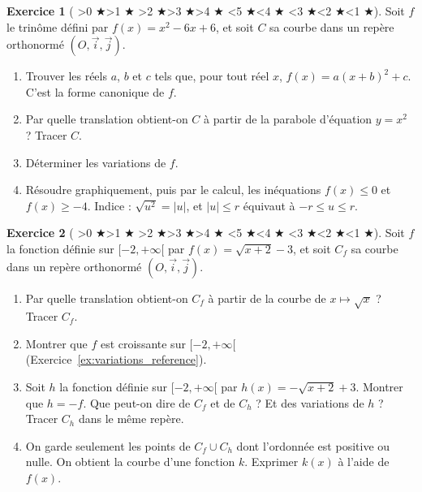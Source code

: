 \documentclass[12pt,a4paper]{article}
\newcommand{\diff}[1]{%
  \textcolor{orange!80!black}{\ifnum#1>0 $\bigstar$\fi\ifnum#1>1 $\bigstar$\fi
  \ifnum#1>2 $\bigstar$\fi\ifnum#1>3 $\bigstar$\fi\ifnum#1>4 $\bigstar$\fi}%
  \textcolor{gray!40}{\ifnum#1<5 $\bigstar$\fi\ifnum#1<4 $\bigstar$\fi
  \ifnum#1<3 $\bigstar$\fi\ifnum#1<2 $\bigstar$\fi\ifnum#1<1 $\bigstar$\fi}}
\theoremstyle{plain}
\theoremstyle{definition}
\newtheorem{exercise}{Exercice}
\theoremstyle{remark}
\begin{document}
\begin{exercise}[\diff{3}]
Soit $f$ le trinôme défini par $f(x) = x^2 - 6x + 6$, et soit $C$ sa courbe dans un
repère orthonormé $(O, \vec{i}, \vec{j})$.
\begin{enumerate}[label=\alph*)]
  \item Trouver les réels $a$, $b$ et $c$ tels que, pour tout réel $x$,
  $f(x) = a(x + b)^2 + c$. C'est la forme canonique de $f$.
  \item Par quelle translation obtient-on $C$ à partir de la parabole d'équation
  $y = x^2$ ? Tracer $C$.
  \item Déterminer les variations de $f$.
  \item Résoudre graphiquement, puis par le calcul, les inéquations $f(x) \le 0$ et
  $f(x) \ge -4$. Indice : $\sqrt{u^2} = \lvert u \rvert$, et $\lvert u \rvert \le r$
  équivaut à $-r \le u \le r$.
\end{enumerate}
\label{ex:canonical_form}
\end{exercise}

\begin{exercise}[\diff{4}]
Soit $f$ la fonction définie sur $[-2, +\infty[$ par $f(x) = \sqrt{x + 2} - 3$, et
soit $C_f$ sa courbe dans un repère orthonormé $(O, \vec{i}, \vec{j})$.
\begin{enumerate}[label=\alph*)]
  \item Par quelle translation obtient-on $C_f$ à partir de la courbe de
  $x \mapsto \sqrt{x}$ ? Tracer $C_f$.
  \item Montrer que $f$ est croissante sur $[-2, +\infty[$ (Exercice~\ref{ex:variations_reference}).
  \item Soit $h$ la fonction définie sur $[-2, +\infty[$ par
  $h(x) = -\sqrt{x + 2} + 3$. Montrer que $h = -f$. Que peut-on dire de $C_f$ et de
  $C_h$ ? Et des variations de $h$ ? Tracer $C_h$ dans le même repère.
  \item On garde seulement les points de $C_f \cup C_h$ dont l'ordonnée est positive
  ou nulle. On obtient la courbe d'une fonction $k$. Exprimer $k(x)$ à l'aide de
  $f(x)$.
\end{enumerate}
\label{ex:sqrt_transformations}
\end{exercise}
\end{document}

